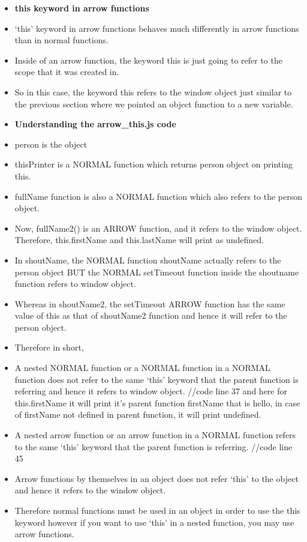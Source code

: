 \documentclass[
  paper=a4,
  ,captions=tableheading
]{scrartcl}
\begin{document}
\begin{itemize}
\item
  \textbf{this keyword in arrow functions}
\item
  `this' keyword in arrow functions behaves much differently in arrow
  functions than in normal functions.
\item
  Inside of an arrow function, the keyword this is just going to refer
  to the scope that it was created in.
\item
  So in this case, the keyword this refers to the window object just
  similar to the previous section where we pointed an object function to
  a new variable.
\item
  \textbf{Understanding the arrow\_this.js code}
\item
  person is the object
\item
  thisPrinter is a NORMAL function which returns person object on
  printing this.
\item
  fullName function is also a NORMAL function which also refers to the
  person object.
\item
  Now, fullName2() is an ARROW function, and it refers to the window
  object. Therefore, this.firstName and this.lastName will print as
  undefined.
\item
  In shoutName, the NORMAL function shoutName actually refers to the
  person object BUT the NORMAL setTimeout function inside the shoutname
  function refers to window object.
\item
  Whereas in shoutName2, the setTimeout ARROW function has the same
  value of this as that of shoutName2 function and hence it will refer
  to the person object.
\item
  Therefore in short,
\item
  A nested NORMAL function or a NORMAL function in a NORMAL function
  does not refer to the same `this' keyword that the parent function is
  referring and hence it refers to window object. //code line 37 and
  here for this.firstName it will print it's parent function firstName
  that is hello, in case of firstName not defined in parent function, it
  will print undefined.
\item
  A nested arrow function or an arrow function in a NORMAL function
  refers to the same `this' keyword that the parent function is
  referring. //code line 45
\item
  Arrow functions by themselves in an object does not refer `this' to
  the object and hence it refers to the window object.
\item
  Therefore normal functions must be used in an object in order to use
  the this keyword however if you want to use `this' in a nested
  function, you may use arrow functions.
\end{itemize}
\end{document}
